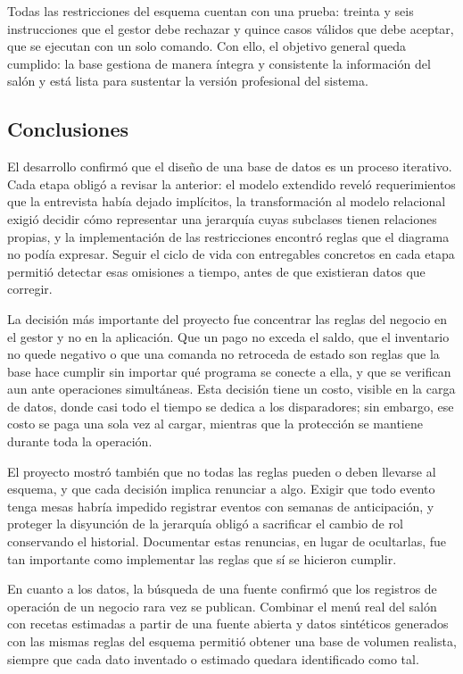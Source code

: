 Todas las restricciones del esquema cuentan con una prueba: treinta y seis instrucciones que el gestor debe rechazar y quince casos válidos que debe aceptar, que se ejecutan con un solo comando. Con ello, el objetivo general queda cumplido: la base gestiona de manera íntegra y consistente la información del salón y está lista para sustentar la versión profesional del sistema.

\subsection{Conclusiones}

El desarrollo confirmó que el diseño de una base de datos es un proceso iterativo. Cada etapa obligó a revisar la anterior: el modelo extendido reveló requerimientos que la entrevista había dejado implícitos, la transformación al modelo relacional exigió decidir cómo representar una jerarquía cuyas subclases tienen relaciones propias, y la implementación de las restricciones encontró reglas que el diagrama no podía expresar. Seguir el ciclo de vida con entregables concretos en cada etapa permitió detectar esas omisiones a tiempo, antes de que existieran datos que corregir.

La decisión más importante del proyecto fue concentrar las reglas del negocio en el gestor y no en la aplicación. Que un pago no exceda el saldo, que el inventario no quede negativo o que una comanda no retroceda de estado son reglas que la base hace cumplir sin importar qué programa se conecte a ella, y que se verifican aun ante operaciones simultáneas. Esta decisión tiene un costo, visible en la carga de datos, donde casi todo el tiempo se dedica a los disparadores; sin embargo, ese costo se paga una sola vez al cargar, mientras que la protección se mantiene durante toda la operación.

El proyecto mostró también que no todas las reglas pueden o deben llevarse al esquema, y que cada decisión implica renunciar a algo. Exigir que todo evento tenga mesas habría impedido registrar eventos con semanas de anticipación, y proteger la disyunción de la jerarquía obligó a sacrificar el cambio de rol conservando el historial. Documentar estas renuncias, en lugar de ocultarlas, fue tan importante como implementar las reglas que sí se hicieron cumplir.

En cuanto a los datos, la búsqueda de una fuente confirmó que los registros de operación de un negocio rara vez se publican. Combinar el menú real del salón con recetas estimadas a partir de una fuente abierta y datos sintéticos generados con las mismas reglas del esquema permitió obtener una base de volumen realista, siempre que cada dato inventado o estimado quedara identificado como tal.


